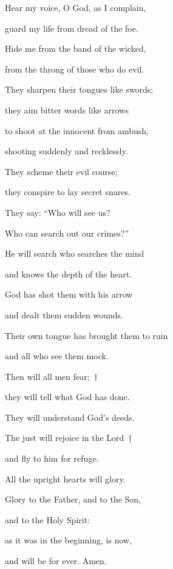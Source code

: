 \noindent Hear my voice, O God, as I complain,~\GreStar{}~\nopagebreak

guard my life from dread of the foe.

\noindent Hide me from the band of the wicked,~\GreStar{}~\nopagebreak

from the throng of those who do evil.

\noindent They sharpen their tongues like swords;~\GreStar{}~\nopagebreak

they aim bitter words like arrows

\noindent to shoot at the innocent from ambush,~\GreStar{}~\nopagebreak

shooting suddenly and recklessly.

\noindent They scheme their evil course;~\GreStar{}~\nopagebreak

they conspire to lay secret snares.

\noindent They say: “Who will see us?~\GreStar{}~\nopagebreak

Who can search out our crimes?”

\noindent He will search who searches the mind~\GreStar{}~\nopagebreak

and knows the depth of the heart.

\noindent God has shot them with his arrow~\GreStar{}~\nopagebreak

and dealt them sudden wounds.

\noindent Their own tongue has brought them to ruin~\GreStar{}~\nopagebreak

and all who see them mock.

\noindent Then will all men fear;~†~\nopagebreak

they will tell what God has done.~\GreStar{}~\nopagebreak

They will understand God’s deeds.

\noindent The just will rejoice in the Lord~†~\nopagebreak

and fly to him for refuge.~\GreStar{}~\nopagebreak

All the upright hearts will glory.

\noindent Glory to the Father, and to the Son,~\GreStar{}~\nopagebreak

and to the Holy Spirit:

\noindent as it was in the beginning, is now,~\GreStar{}~\nopagebreak

and will be for ever. Amen.
